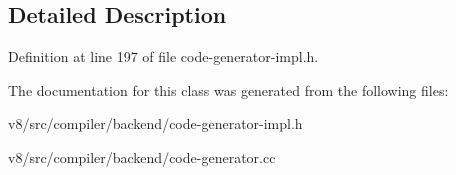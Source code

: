 \subsection{Detailed Description}


Definition at line 197 of file code-\/generator-\/impl.\+h.



The documentation for this class was generated from the following files\+:\begin{DoxyCompactItemize}
\item 
v8/src/compiler/backend/code-\/generator-\/impl.\+h\item 
v8/src/compiler/backend/code-\/generator.\+cc\end{DoxyCompactItemize}

